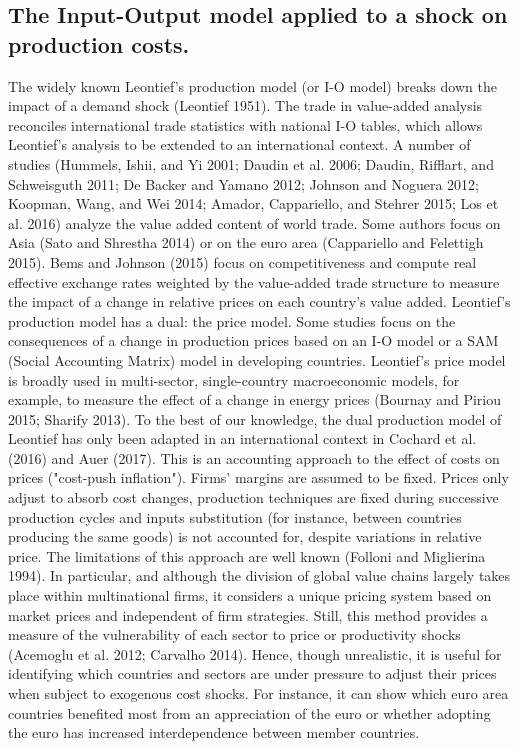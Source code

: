 \documentclass[11pt,a4paper]{article}
\begin{document}
\subsection{The Input-Output model applied to a shock on production costs.}
\label{subsec:io}
The widely known Leontief's production model (or I-O model) breaks down the impact of a demand shock (Leontief 1951). The trade in value-added analysis reconciles international trade statistics with national I-O tables, which allows Leontief's analysis to be extended to an international context. A number of studies (Hummels, Ishii, and Yi 2001; Daudin et al. 2006; Daudin, Rifflart, and Schweisguth 2011; De Backer and Yamano 2012; Johnson and Noguera 2012; Koopman, Wang, and Wei 2014; Amador, Cappariello, and Stehrer 2015; Los et al. 2016) analyze the value added content of world trade. Some authors focus on Asia (Sato and Shrestha 2014) or on the euro area (Cappariello and Felettigh 2015). Bems and Johnson (2015) focus on competitiveness and compute real effective exchange rates weighted by the value-added trade structure to measure the impact of a change in relative prices on each country's value added.
Leontief's production model has a dual: the price model. Some studies focus on the consequences of a change in production prices based on an I-O model or a SAM (Social Accounting Matrix) model in developing countries. Leontief's price model is broadly used in multi-sector, single-country macroeconomic models, for example, to measure the effect of a change in energy prices (Bournay and Piriou 2015; Sharify 2013). To the best of our knowledge, the dual production model of Leontief has only been adapted in an international context in Cochard et al. (2016) and Auer (2017). 
This is an accounting approach to the effect of costs on prices ("cost-push inflation"). Firms' margins are assumed to be fixed. Prices only adjust to absorb cost changes, production techniques are fixed during successive production cycles and inputs substitution (for instance, between countries producing the same goods) is not accounted for, despite variations in relative price. The limitations of this approach are well known (Folloni and Miglierina 1994). In particular, and although the division of global value chains largely takes place within multinational firms, it considers a unique pricing system based on market prices and independent of firm strategies. Still, this method provides a measure of the vulnerability of each sector to price or productivity shocks (Acemoglu et al. 2012; Carvalho 2014). Hence, though unrealistic, it is useful for identifying which countries and sectors are under pressure to adjust their prices when subject to exogenous cost shocks. For instance, it can show which euro area countries benefited most from an appreciation of the euro or whether adopting the euro has increased interdependence between member countries.
\end{document}
